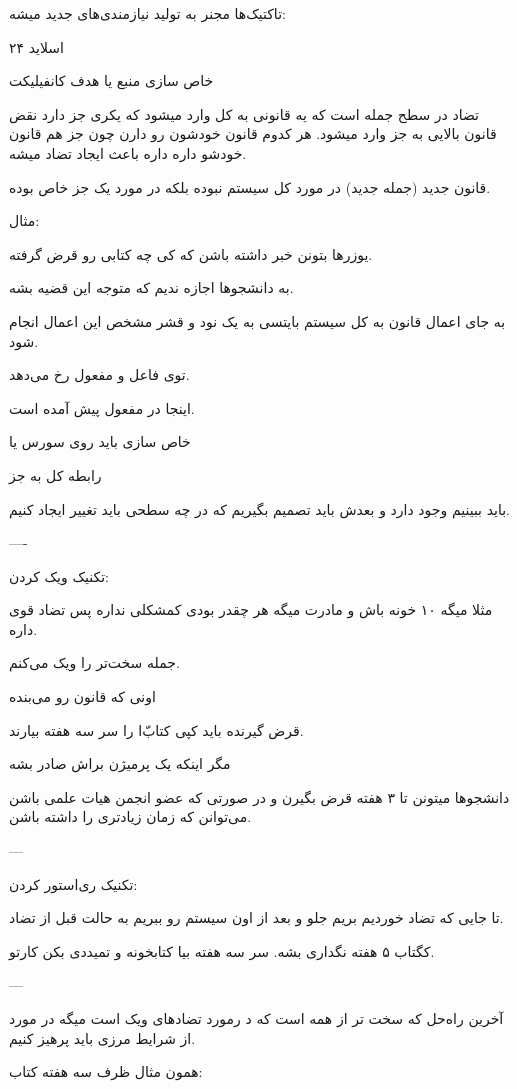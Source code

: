 
تاکتیک‌ها مجنر به تولید نیازمندی‌های جدید میشه:

اسلاید ۲۴

خاص سازی منبع یا هدف کانفیلیکت

تضاد در سطح جمله است که یه قانونی به کل وارد میشود که یکری جز دارد نقض قانون
بالایی به جز وارد میشود. هر کدوم قانون خودشون رو دارن چون جز هم قانون خودشو داره
داره باعث ایجاد تضاد میشه.

قانون جدید (جمله جدید) در مورد کل سیستم نبوده بلکه در مورد یک جز خاص بوده.

مثال:

یوزر‌ها بتونن خبر داشته باشن که کی چه کتابی رو قرض گرفته.

به دانشجو‌ها اجازه ندیم که متوجه این قضیه بشه.

به جای اعمال قانون به کل سیستم بایتسی به یک نود و قشر مشخص این اعمال انجام شود.

توی فاعل و مفعول رخ می‌دهد.

اینجا در مفعول پیش آمده است.

خاص سازی باید روی سورس یا 

رابطه کل به جز

باید ببینیم وجود دارد و بعدش باید تصمیم بگیریم که در چه سطحی باید تغییر ایجاد
کنیم.

----

تکنیک ویک کردن:

مثلا میگه ۱۰ خونه باش و مادرت میگه هر چقدر بودی کمشکلی نداره پس تضاد قوی داره.

جمله سخت‌تر را ویک می‌کنم.

اونی که قانون رو می‌بنده

قرض گیرنده باید کپی کتاب‌ّا را سر سه هفته بیارند.

مگر اینکه یک پرمیژن براش صادر بشه

دانشجو‌ها میتونن تا ۳ هفته قرض بگیرن و در صورتی که عضو انجمن هیات علمی باشن
می‌توانن که زمان زیادتری را داشته باشن.

---

تکنیک ری‌استور کردن:

تا جایی که تضاد خوردیم بریم جلو
و بعد از اون سیستم رو ببریم به حالت قبل از تضاد.

کگتاب ۵ هفته نگداری بشه. سر سه هفته بیا کتابخونه و تمیددی بکن کارتو.

---

آخرین راه‌حل که سخت تر از همه است که د رمورد تضاد‌های ویک است میگه در مورد از
شرایط مرزی باید پرهیز کنیم.

همون مثال ظرف سه هفته کتاب:

